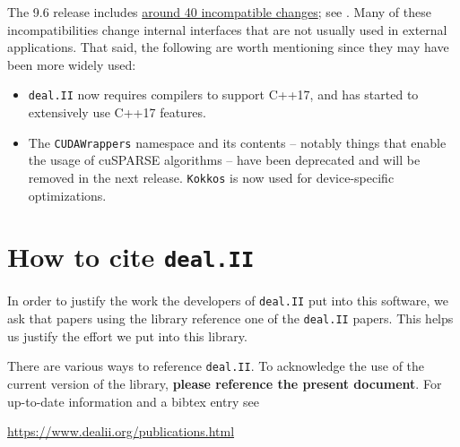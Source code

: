 \documentclass{ansarticle-preprint}
\newcommand{\specialword}[1]{\texttt{#1}}
\newcommand{\dealii}{{\specialword{deal.II}}\xspace}
\newcommand{\kokkos}{{\specialword{Kokkos}}\xspace}
\begin{document}
The 9.6 release includes
\href{https://dealii.org/developer/doxygen/deal.II/changes_between_9_5_2_and_9_6_0.html}
     {around 40 incompatible changes};
see \cite{changes96}. Many of these
incompatibilities change internal
interfaces that are not usually used in external
applications. That said, the following are worth mentioning since they
may have been more widely used:
\begin{itemize}
  \item \dealii{} now requires compilers to support C++17, and has
    started to extensively use C++17 features.
  \item The \texttt{CUDAWrappers} namespace and its contents --
    notably things that enable the usage of cuSPARSE algorithms --
    have been deprecated and will be removed in the next
    release. \kokkos{} is now used for device-specific optimizations.
\end{itemize}



\section{How to cite \dealii}\label{sec:cite}

In order to justify the work the developers of \dealii put into this
software, we ask that papers using the library reference one of the
\dealii papers. This helps us justify the effort we put into this library.

There are various ways to reference \dealii. To acknowledge the use of
the current version of the library, \textbf{please reference the present
  document}. For up-to-date information and a bibtex entry
see
\begin{center}
  \url{https://www.dealii.org/publications.html}
\end{center}
\end{document}
